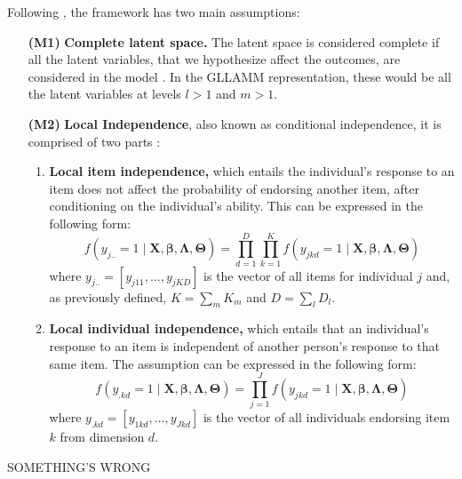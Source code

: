 Following \citet{Skrondal_et_al_2004a}, the framework has two main assumptions:
%
\begin{enumerate}
	\item[\textbf{(M1)}] \textbf{Complete latent space.} The latent space is considered complete if all the latent variables, that we hypothesize affect the outcomes, are considered in the model \citep{Hambleton_et_al_1991b}. In the GLLAMM representation, these would be all the latent variables at levels $l > 1$ and $m > 1$.
	\item[\textbf{(M2)}] \textbf{Local Independence}, also known as conditional independence, it is comprised of two parts \cite{Reckase_2009, Baker_2001, Hambleton_et_al_1991a}: 
	\begin{enumerate}
		\item \textbf{Local item independence,} which entails the individual's response to an item does not affect the probability of endorsing another item, after conditioning on the individual's ability. This can be expressed in the following form:
		\begin{equation}
			f \left( y_{j..}=1 \; | \; \mathbf{X}, \pmb{\beta}, \pmb{\Lambda}, \pmb{\Theta} \right) = \prod_{d=1}^{D} \prod_{k=1}^{K} f \left( y_{jkd}=1 \; | \; \mathbf{X}, \pmb{\beta}, \pmb{\Lambda}, \pmb{\Theta} \right)
		\end{equation}
		where $y_{j..} = [ y_{j11}, \dots, y_{jKD}]$ is the vector of all items for individual $j$ and, as previously defined, $K = \sum_{m} K_{m}$ and $D = \sum_{l} D_{l}$. \\
		\item \textbf{Local individual independence,} which entails that an individual's response to an item is independent of another person's response to that same item. The assumption can be expressed in the following form:
		\begin{equation}
			f \left( y_{.kd}=1 \; | \; \mathbf{X}, \pmb{\beta}, \pmb{\Lambda}, \pmb{\Theta} \right) = \prod_{j=1}^{J} f \left( y_{jkd}=1 \; | \; \mathbf{X}, \pmb{\beta}, \pmb{\Lambda}, \pmb{\Theta} \right)
		\end{equation}
		where $y_{.kd} = [ y_{1kd}, \dots, y_{Jkd}]$ is the vector of all individuals endorsing item $k$ from dimension $d$.
	\end{enumerate}
\end{enumerate}

{\color{red} SOMETHING'S WRONG}
